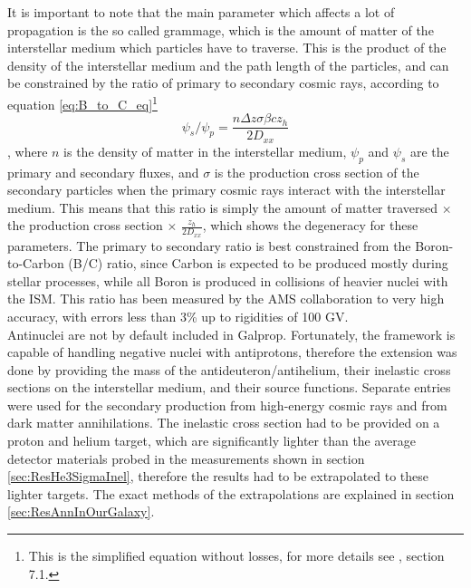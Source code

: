 It is important to note that the main parameter which affects a lot of propagation is the so called grammage, which is the amount of matter of the interstellar medium which particles have to traverse. This is the product of the density of the interstellar medium and the path length of the particles, and can be constrained by the ratio of primary to secondary cosmic rays, according to equation \ref{eq:B_to_C_eq}\footnote{This is the simplified equation without losses, for more details see \cite{GALPROP_Expl_Supplement}, section 7.1.}
\begin{equation}
    \psi_s / \psi_p = \frac{n\Delta z \sigma \beta c z_h}{2D_{xx}}
    \label{eq:B_to_C_eq}
\end{equation}
, where $n$ is the density of matter in the interstellar medium, $\psi_p$ and $\psi_s$ are the primary and secondary fluxes, and $\sigma$ is the production cross section of the secondary particles when the primary cosmic rays interact with the interstellar medium. This means that this ratio is simply the amount of matter traversed $\times$ the production cross section $\times$ $\frac{z_h}{2D_{xx}}$, which shows the degeneracy for these parameters. The primary to secondary ratio is best constrained from the Boron-to-Carbon (B/C) ratio, since Carbon is expected to be produced mostly during stellar processes, while all Boron is produced in collisions of heavier nuclei with the ISM\cite{AMS_B_to_C}. This ratio has been measured by the AMS collaboration to very high accuracy\cite{AMS_B_to_C}, with errors less than 3\% up to rigidities of 100 GV.\\

Antinuclei are not by default included in Galprop. Fortunately, the framework is capable of handling negative nuclei with antiprotons, therefore the extension was done by providing the mass of the antideuteron/antihelium, their inelastic cross sections on the interstellar medium, and their source functions. Separate entries were used for the secondary production from high-energy cosmic rays and from dark matter annihilations. The inelastic cross section had to be provided on a proton and helium target, which are significantly lighter than the average detector materials probed in the measurements shown in section \ref{sec:ResHe3SigmaInel}, therefore the results had to be extrapolated to these lighter targets. The exact methods of the extrapolations are explained in section \ref{sec:ResAnnInOurGalaxy}.\\

